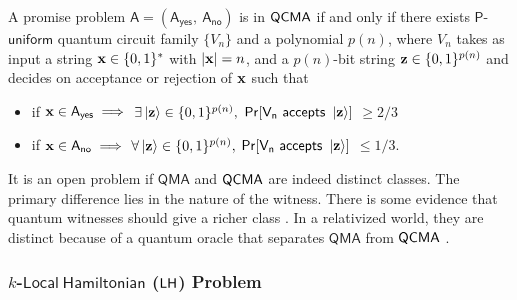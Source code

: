 \documentclass[11pt]{article}
\begin{document}
\begin{definition}
     A promise problem $\mathsf{A=(A_{yes},\ A_{no})}$ is in   $\mathsf{QCMA}$ if and only if there exists $\mathsf{P}$-$\mathsf{uniform}$ quantum circuit family $\{V_n\}$ and a polynomial $p(n)$, where $V_n$ takes as input a string $\mathbf{x}\in \{0,1\}^*$ with $|\mathbf{x}|=n$, and a $p(n)$-bit string $\mathbf{z}\in \{0,1\}^{p(n)}$ and decides on acceptance or rejection of $\mathbf{x}$ such that 
    \begin{itemize}
        \item if $\mathbf{x}\in \mathsf{A_{yes}} \implies$ $\exists \ket{\mathbf{z}}\in \{0,1\}^{p(n)},$ $\mathsf{Pr[V_n\ accepts\ \ket{\zz}]}$ $\geq 2/3$
        \item if $\mathbf{x}\in \mathsf{A_{no}} \implies$ $\forall \ket{\mathbf{z}} \in \{0,1\}^{p(n)},$ $\mathsf{Pr[V_n\ accepts\ \ket{\zz}]}$ $\leq 1/3.$
    \end{itemize}
\end{definition}

It is an open problem if $\mathsf{QMA}$ and $\mathsf{QCMA}$ are indeed distinct classes. The primary difference lies in the nature of the witness. There is some evidence that quantum witnesses should give a richer class \cite{vidick2016quantum}. In a relativized world, they are distinct because of a quantum oracle that separates $\mathsf{QMA}$ from $\mathsf{QCMA}$ \cite{aaronson2007quantum}.

\subsubsection{$k$-$\mathsf{Local\ Hamiltonian}$ ($\mathsf{LH}$) Problem}\label{subsec: loc ham variants.}
\end{document}

